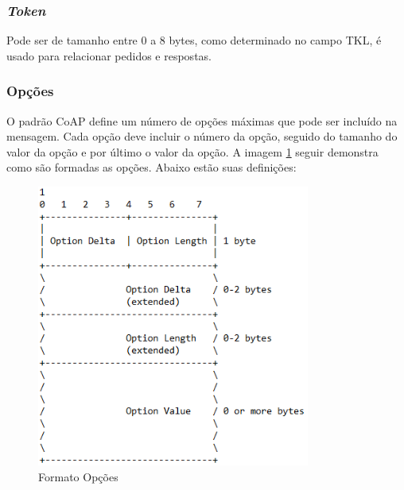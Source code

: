 \subsubsection {\textit{Token}}

Pode ser de tamanho entre 0 a 8 bytes, como determinado no campo TKL, é usado para relacionar pedidos e respostas.

\subsubsection {Opções}
\label{subsubsubsection{coap_option}}

O padrão CoAP define um número de opções máximas que pode ser incluído na mensagem. Cada opção deve incluir o número da opção, seguido do tamanho do valor da opção e por último o valor da opção. A imagem \ref{fig:opcoes_format} seguir demonstra como são formadas as opções. Abaixo estão suas definições:
\begin{figure}[!htb]
	\centering
	\includegraphics[width=0.8\textwidth]{OPTIONS}
	\caption{Formato Opções}
	\label{fig:opcoes_format}
\end{figure}

